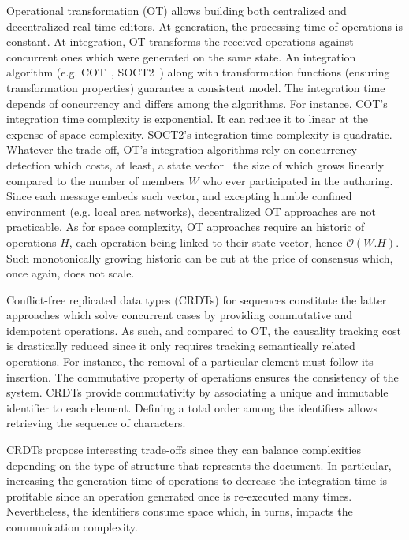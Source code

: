 \begin{asparadesc}
\item [Operational transformation] (OT) allows building both centralized and
  decentralized real-time editors. At generation, the processing time of
  operations is constant. At integration, OT transforms the received operations
  against concurrent ones which were generated on the same state. An integration
  algorithm (e.g. COT~\cite{sun2009contextbased}, SOCT2~\cite{vidot2000copies})
  along with transformation functions (ensuring transformation properties)
  guarantee a consistent model. The integration time depends of concurrency and
  differs among the algorithms.  For instance, COT's integration time complexity
  is exponential. It can reduce it to linear at the expense of space
  complexity. SOCT2's integration time complexity is quadratic.  Whatever the
  trade-off, OT's integration algorithms rely on concurrency detection which
  costs, at least, a state vector~\cite{charronbost1991concerning} the size of
  which grows linearly compared to the number of members $W$ who ever
  participated in the authoring. Since each message embeds such vector, and
  excepting humble confined environment (e.g. local area networks),
  decentralized OT approaches are not practicable. As for space complexity, OT
  approaches require an historic of operations $H$, each operation being linked
  to their state vector, hence $\mathcal{O}(W.H)$. Such monotonically
  growing historic can be cut at the price of consensus which, once again, does
  not scale.

\item [Conflict-free replicated data types] (CRDTs) for sequences constitute the
  latter approaches which solve concurrent cases by providing commutative and
  idempotent operations. As such, and compared to OT, the causality tracking
  cost is drastically reduced since it only requires tracking semantically
  related operations. For instance, the removal of a particular element must
  follow its insertion. The commutative property of operations ensures the
  consistency of the system. CRDTs provide commutativity by associating a unique
  and immutable identifier to each element. Defining a total order among the
  identifiers allows retrieving the sequence of characters. 

  CRDTs propose interesting trade-offs since they can balance complexities
  depending on the type of structure that represents the document.  In
  particular, increasing the generation time of operations to decrease the
  integration time is profitable since an operation generated once is
  re-executed many times. Nevertheless, the identifiers consume space which, in
  turns, impacts the communication complexity.


\end{asparadesc}
